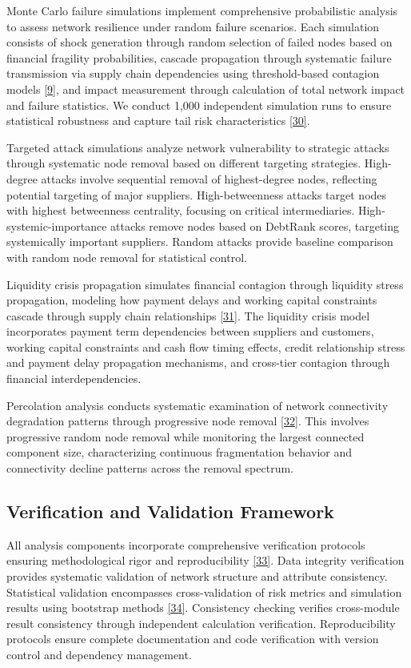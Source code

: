 \documentclass[a4 paper, 11pt,twoside]{article}
\newcommand{\0}{\Bf{0}}
\theoremstyle{definition}
\begin{document}
Monte Carlo failure simulations implement comprehensive probabilistic analysis to assess network resilience under random failure scenarios. Each simulation consists of shock generation through random selection of failed nodes based on financial fragility probabilities, cascade propagation through systematic failure transmission via supply chain dependencies using threshold-based contagion models \hyperref[ref9]{[9]}, and impact measurement through calculation of total network impact and failure statistics. We conduct 1,000 independent simulation runs to ensure statistical robustness and capture tail risk characteristics \hyperref[ref30]{[30]}.

Targeted attack simulations analyze network vulnerability to strategic attacks through systematic node removal based on different targeting strategies. High-degree attacks involve sequential removal of highest-degree nodes, reflecting potential targeting of major suppliers. High-betweenness attacks target nodes with highest betweenness centrality, focusing on critical intermediaries. High-systemic-importance attacks remove nodes based on DebtRank scores, targeting systemically important suppliers. Random attacks provide baseline comparison with random node removal for statistical control.

Liquidity crisis propagation simulates financial contagion through liquidity stress propagation, modeling how payment delays and working capital constraints cascade through supply chain relationships \hyperref[ref31]{[31]}. The liquidity crisis model incorporates payment term dependencies between suppliers and customers, working capital constraints and cash flow timing effects, credit relationship stress and payment delay propagation mechanisms, and cross-tier contagion through financial interdependencies.

Percolation analysis conducts systematic examination of network connectivity degradation patterns through progressive node removal \hyperref[ref32]{[32]}. This involves progressive random node removal while monitoring the largest connected component size, characterizing continuous fragmentation behavior and connectivity decline patterns across the removal spectrum.

\subsection{Verification and Validation Framework}

All analysis components incorporate comprehensive verification protocols ensuring methodological rigor and reproducibility \hyperref[ref33]{[33]}. Data integrity verification provides systematic validation of network structure and attribute consistency. Statistical validation encompasses cross-validation of risk metrics and simulation results using bootstrap methods \hyperref[ref34]{[34]}. Consistency checking verifies cross-module result consistency through independent calculation verification. Reproducibility protocols ensure complete documentation and code verification with version control and dependency management.
\end{document}
